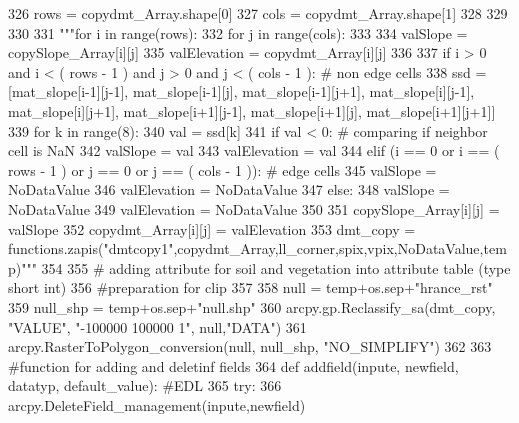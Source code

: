 \begin{DoxyCode}
{}
326   rows = copydmt\_Array.shape[0]
327   cols = copydmt\_Array.shape[1]
328 
329 
330 
331   \textcolor{stringliteral}{"""for i in range(rows):
}
332 \textcolor{stringliteral}{    for j in range(cols):
}
333 \textcolor{stringliteral}{
}
334 \textcolor{stringliteral}{      valSlope = copySlope\_Array[i][j]
}
335 \textcolor{stringliteral}{      valElevation = copydmt\_Array[i][j]
}
336 \textcolor{stringliteral}{
}
337 \textcolor{stringliteral}{      if i > 0 and i < ( rows - 1 ) and j > 0 and j < ( cols - 1 ): # non edge cells
}
338 \textcolor{stringliteral}{  ssd = [mat\_slope[i-1][j-1], mat\_slope[i-1][j], mat\_slope[i-1][j+1], mat\_slope[i][j-1], mat\_slope[i][j+1],
       mat\_slope[i+1][j-1], mat\_slope[i+1][j], mat\_slope[i+1][j+1]]
}
339 \textcolor{stringliteral}{  for k in range(8):
}
340 \textcolor{stringliteral}{    val = ssd[k]
}
341 \textcolor{stringliteral}{    if val < 0: # comparing if neighbor cell is NaN
}
342 \textcolor{stringliteral}{      valSlope = val
}
343 \textcolor{stringliteral}{      valElevation = val
}
344 \textcolor{stringliteral}{      elif (i == 0 or i == ( rows - 1 ) or j == 0 or j == ( cols - 1 )): # edge cells
}
345 \textcolor{stringliteral}{         valSlope = NoDataValue
}
346 \textcolor{stringliteral}{         valElevation = NoDataValue
}
347 \textcolor{stringliteral}{      else:
}
348 \textcolor{stringliteral}{         valSlope = NoDataValue
}
349 \textcolor{stringliteral}{         valElevation = NoDataValue
}
350 \textcolor{stringliteral}{
}
351 \textcolor{stringliteral}{      copySlope\_Array[i][j] = valSlope
}
352 \textcolor{stringliteral}{      copydmt\_Array[i][j] = valElevation
}
353 \textcolor{stringliteral}{  dmt\_copy = functions.zapis("dmtcopy1",copydmt\_Array,ll\_corner,spix,vpix,NoDataValue,temp)"""}
354 
355   \textcolor{comment}{# adding attribute for soil and vegetation into attribute table (type short int)
}
356   \textcolor{comment}{#preparation for clip
}
357 
358   null = temp+os.sep+\textcolor{stringliteral}{"hrance\_rst"}
359   null\_shp = temp+os.sep+\textcolor{stringliteral}{"null.shp"}
360   arcpy.gp.Reclassify\_sa(dmt\_copy, \textcolor{stringliteral}{"VALUE"}, \textcolor{stringliteral}{"-100000 100000 1"}, null,\textcolor{stringliteral}{"DATA"})
361   arcpy.RasterToPolygon\_conversion(null, null\_shp, \textcolor{stringliteral}{"NO\_SIMPLIFY"})
362 
363   \textcolor{comment}{#function for adding and deletinf fields
}
364   \textcolor{keyword}{def }addfield(inpute, newfield, datatyp, default\_value): \textcolor{comment}{#EDL
}
365       \textcolor{keywordflow}{try}:
366         arcpy.DeleteField\_management(inpute,newfield)

\end{DoxyCode}
